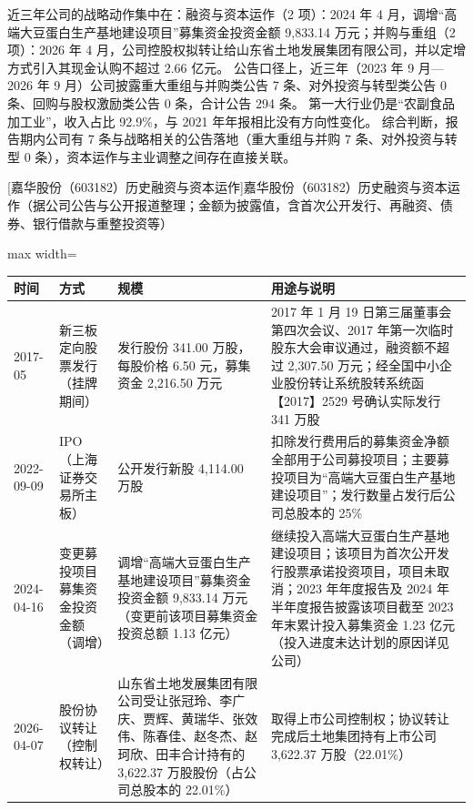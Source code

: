  近三年公司的战略动作集中在：融资与资本运作（2 项）：2024 年 4 月，调增“高端大豆蛋白生产基地建设项目”募集资金投资金额 9,833.14 万元；并购与重组（2 项）：2026 年 4 月，公司控股权拟转让给山东省土地发展集团有限公司，并以定增方式引入其现金认购不超过 2.66 亿元。 公告口径上，近三年（2023 年 9 月---2026 年 9 月）公司披露重大重组与并购类公告 7 条、对外投资与转型类公告 0 条、回购与股权激励类公告 0 条，合计公告 294 条。 第一大行业仍是“农副食品加工业”，收入占比 92.9\%，与 2021 年年报相比没有方向性变化。 综合判断，报告期内公司有 7 条与战略相关的公告落地（重大重组与并购 7 条、对外投资与转型 0 条），资本运作与主业调整之间存在直接关联。

\begin{center}\small\setlength{\tabcolsep}{4pt}
[嘉华股份（603182）历史融资与资本运作]{嘉华股份（603182）历史融资与资本运作（据公司公告与公开报道整理；金额为披露值，含首次公开发行、再融资、债券、银行借款与重整投资等）}
\begin{adjustbox}{max width=\textwidth}
\begin{tabular}{@{}p{1.45cm}p{2.55cm}p{4.05cm}p{4.95cm}@{}}
\toprule
时间 & 方式 & 规模 & 用途与说明 \\
\midrule
2017-05 & 新三板定向股票发行（挂牌期间） & 发行股份 341.00 万股，\allowbreak{}每股价格 6.50 元，\allowbreak{}募集资金 2,\allowbreak{}216.50 万元 & 2017 年 1 月 19 日第三届董事会第四次会议、\allowbreak{}2017 年第一次临时股东大会审议通过，\allowbreak{}融资额不超过 2,\allowbreak{}307.50 万元；经全国中小企业股份转让系统股转系统函【2017】2529 号确认实际发行 341 万股 \\
2022-09-09 & IPO（上海证券交易所主板） & 公开发行新股 4,\allowbreak{}114.00 万股 & 扣除发行费用后的募集资金净额全部用于公司募投项目；主要募投项目为“高端大豆蛋白生产基地建设项目”；发行数量占发行后公司总股本的 25\% \\
2024-04-16 & 变更募投项目募集资金投资金额（调增） & 调增“高端大豆蛋白生产基地建设项目”募集资金投资金额 9,\allowbreak{}833.14 万元（变更前该项目募集资金投资总额 1.13 亿元） & 继续投入高端大豆蛋白生产基地建设项目；该项目为首次公开发行股票承诺投资项目，\allowbreak{}项目未取消；2023 年年度报告及 2024 年半年度报告披露该项目截至 2023 年末累计投入募集资金 1.23 亿元（投入进度未达计划的原因详见公司） \\
2026-04-07 & 股份协议转让（控制权转让） & 山东省土地发展集团有限公司受让张冠玲、\allowbreak{}李广庆、\allowbreak{}贾辉、\allowbreak{}黄瑞华、\allowbreak{}张效伟、\allowbreak{}陈春佳、\allowbreak{}赵冬杰、\allowbreak{}赵珂欣、\allowbreak{}田丰合计持有的 3,\allowbreak{}622.37 万股股份（占公司总股本的 22.01\%） & 取得上市公司控制权；协议转让完成后土地集团持有上市公司 3,\allowbreak{}622.37 万股（22.01\%） \\

\end{tabular}
\end{adjustbox}
\end{center}
